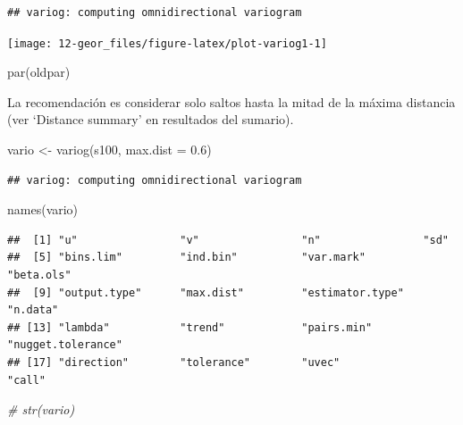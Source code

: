 \documentclass[
  spanish,
]{book}
\newenvironment{Shaded}{\begin{snugshade}}{\end{snugshade}}
\newcommand{\AttributeTok}[1]{\textcolor[rgb]{0.77,0.63,0.00}{#1}}
\newcommand{\CommentTok}[1]{\textcolor[rgb]{0.56,0.35,0.01}{\textit{#1}}}
\newcommand{\FloatTok}[1]{\textcolor[rgb]{0.00,0.00,0.81}{#1}}
\newcommand{\FunctionTok}[1]{\textcolor[rgb]{0.00,0.00,0.00}{#1}}
\newcommand{\NormalTok}[1]{#1}
\newcommand{\OtherTok}[1]{\textcolor[rgb]{0.56,0.35,0.01}{#1}}
\theoremstyle{break}
\begin{document}
\begin{verbatim}
## variog: computing omnidirectional variogram
\end{verbatim}

\begin{center}\texttt{[image: 12-geor\_files/figure-latex/plot-variog1-1]} \end{center}

\begin{Shaded}
\begin{Highlighting}[]
\FunctionTok{par}\NormalTok{(oldpar)}
\end{Highlighting}
\end{Shaded}

La recomendación es considerar solo saltos hasta la mitad de la máxima
distancia (ver `Distance summary' en resultados del sumario).

\begin{Shaded}
\begin{Highlighting}[]
\NormalTok{vario }\OtherTok{\textless{}{-}} \FunctionTok{variog}\NormalTok{(s100, }\AttributeTok{max.dist =} \FloatTok{0.6}\NormalTok{)}
\end{Highlighting}
\end{Shaded}

\begin{verbatim}
## variog: computing omnidirectional variogram
\end{verbatim}

\begin{Shaded}
\begin{Highlighting}[]
\FunctionTok{names}\NormalTok{(vario)}
\end{Highlighting}
\end{Shaded}

\begin{verbatim}
##  [1] "u"                "v"                "n"                "sd"              
##  [5] "bins.lim"         "ind.bin"          "var.mark"         "beta.ols"        
##  [9] "output.type"      "max.dist"         "estimator.type"   "n.data"          
## [13] "lambda"           "trend"            "pairs.min"        "nugget.tolerance"
## [17] "direction"        "tolerance"        "uvec"             "call"
\end{verbatim}

\begin{Shaded}
\begin{Highlighting}[]
\CommentTok{\# str(vario)}
\end{Highlighting}
\end{Shaded}
\end{document}
